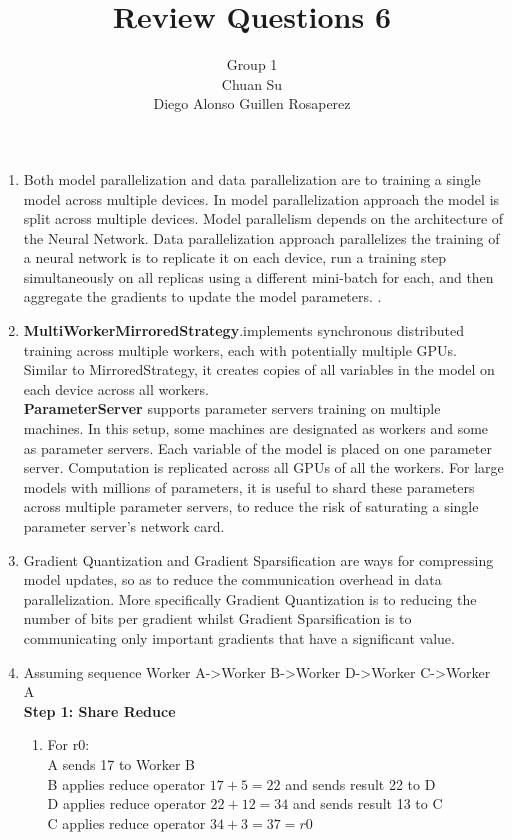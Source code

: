 \documentclass[12pt]{article}
\begin{document}
\title{Review Questions 6}
\author{Group 1 \\ Chuan Su \\ Diego Alonso Guillen Rosaperez}

\maketitle
\begin{enumerate}
\item Both model parallelization and data parallelization are to training a single model across multiple devices. In model parallelization approach the model is split across multiple devices. Model parallelism depends on the architecture of the Neural Network. Data parallelization approach parallelizes the training of a neural network is to replicate it on each device, run a training step simultaneously on all replicas using a different mini-batch for each, and then aggregate the gradients to update the model parameters. .
\item \textbf{MultiWorkerMirroredStrategy}.implements synchronous distributed training across multiple workers, each with potentially multiple GPUs. Similar to MirroredStrategy, it creates copies of all variables in the model on each device across all workers.\\
\textbf{ParameterServer} supports parameter servers training on multiple machines. In this setup, some machines are designated as workers and some as parameter servers. Each variable of the model is placed on one parameter server. Computation is replicated across all GPUs of all the workers.
For large models with millions of parameters, it is useful to shard these parameters across multiple parameter servers, to reduce the risk of saturating a single parameter server’s network card. \\
\item Gradient Quantization and Gradient Sparsification are ways for compressing model updates, so as to reduce the communication overhead in data parallelization. More specifically Gradient Quantization is to reducing the number of bits per gradient whilst Gradient Sparsification is to communicating only important gradients that have a significant value.
\item Assuming sequence Worker A->Worker B->Worker D->Worker C->Worker A\\
\textbf{Step 1: Share Reduce}
\begin{enumerate}
	\item For r0:\\
	A sends 17 to Worker B\\
	B applies reduce operator $17 + 5 = 22$ and sends result 22 to D\\
	D applies reduce operator $22 + 12 = 34$ and sends result 13 to C\\
	C applies reduce operator $34 + 3 = 37 = r0$


\end{enumerate}
\end{enumerate}
\end{document}
